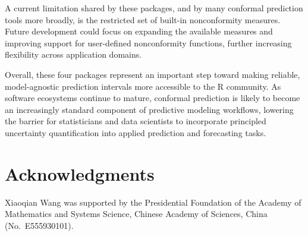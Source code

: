 A current limitation shared by these packages, and by many conformal
prediction tools more broadly, is the restricted set of built-in
nonconformity measures. Future development could focus on expanding the
available measures and improving support for user-defined nonconformity
functions, further increasing flexibility across application domains.

Overall, these four packages represent an important step toward making
reliable, model-agnostic prediction intervals more accessible to the R
community. As software ecosystems continue to mature, conformal
prediction is likely to become an increasingly standard component of
predictive modeling workflows, lowering the barrier for statisticians
and data scientists to incorporate principled uncertainty quantification
into applied prediction and forecasting tasks.

\section{Acknowledgments}\label{acknowledgments}

Xiaoqian Wang was supported by the Presidential Foundation of the Academy of Mathematics and Systems Science, Chinese Academy of Sciences, China (No.~E555930101).



\address{%
Jesus Uriel Diaz-Martinez\\
King Abdullah University of Science and Technology (KAUST)\\%
Computer, Electrical and Mathematical Sciences and Engineering Division\\ Department of Statistics\\ Thuwal, 23955-6900, Kingdom of Saudi Arabia\\
%
%
%
\href{mailto:jesus.diazmartinez@kaust.edu.sa}{\nolinkurl{jesus.diazmartinez@kaust.edu.sa}}%
}

\address{%
Xiaoqian Wang\\
Academy of Mathematics and Systems Science, Chinese Academy of Sciences\\%
The Center for Forecasting Science (corresponding author)\\ Beijing, China\\
%
\url{https://xqnwang.rbind.io/}\\%
\textit{ORCiD: \href{https://orcid.org/0000-0003-4827-496X}{0000-0003-4827-496X}}\\%
\href{mailto:xiaoqian.wang@amss.ac.cn}{\nolinkurl{xiaoqian.wang@amss.ac.cn}}%
}

\address{%
Paula Moraga\\
King Abdullah University of Science and Technology (KAUST)\\%
Computer, Electrical and Mathematical Sciences and Engineering Division\\ Department of Statistics\\ Thuwal, 23955-6900, Kingdom of Saudi Arabia\\
%
\url{http://www.paulamoraga.com}\\%
\textit{ORCiD: \href{https://orcid.org/0000-0001-5266-0201}{0000-0001-5266-0201}}\\%
\href{mailto:paula.moraga@kaust.edu.sa}{\nolinkurl{paula.moraga@kaust.edu.sa}}%
}
